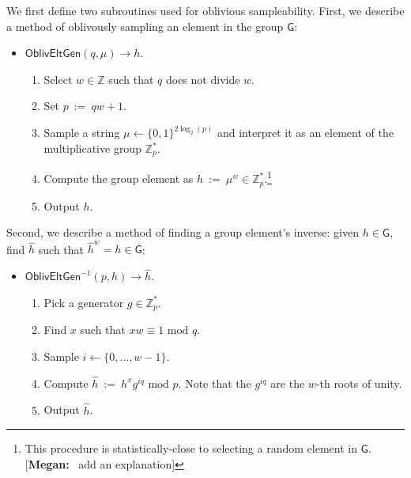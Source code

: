 \documentclass[11pt,letterpaper]{article}
\newcommand{\authnote}[2]{[{\color{red}\textbf{#1:}}~{\color{blue} #2}]}
\newcommand{\authnote}[2]{}
\newcommand{\megan}[1]{\authnote{Megan}{#1}}
\theoremstyle{plain} %
\theoremstyle{definition} %
\theoremstyle{remark} %
\newcommand{\eqdef}{\ {:=} \ }
\newcommand{\Bits}{\{0,1\}}
\newcommand{\Integers}{\mathbb{Z}}
\newcommand{\Group}{\mathsf{G}}
\newcommand{\GrpOrd}{q}
\newcommand{\GrpEltH}{h}
\newcommand{\Generator}{g}
\begin{document}
\newcommand{\GrpEltG}{g}
\newcommand{\MultGrpOrd}{p}
\newcommand{\OrdW}{w}
\newcommand{\RandStr}{\mu}
\newcommand{\OblivEltGen}{\mathsf{OblivEltGen}}
\newcommand{\OblivEltInv}{\mathsf{OblivEltGen}^{-1}}
We first define two subroutines used for oblivious sampleability.
First, we describe a method of oblivously sampling an element in the group $\Group$:
\begin{itemize}
\item[]$\OblivEltGen(\GrpOrd, \RandStr) \to \GrpEltH$.
    \begin{enumerate}[nolistsep]
        \item Select $\OrdW \in \Integers$ such that $\GrpOrd$ does not divide $\OrdW$.
        \item Set $\MultGrpOrd \eqdef \GrpOrd \OrdW + 1$.
        \item Sample a string $\RandStr \gets \Bits^{2 \log_2 (\MultGrpOrd)}$ and interpret it as an element of the multiplicative group $\Integers^{*}_{\MultGrpOrd}$.
        \item Compute the group element as $\GrpEltH \eqdef \RandStr^{\OrdW} \in \Integers^{*}_{\MultGrpOrd}$.\footnote{This procedure is statistically-close to selecting a random element in $\Group$. \megan{add an explanation}}
        \item Output $\GrpEltH$.
    \end{enumerate}
\end{itemize}
\newcommand{\Inv}[1]{\hat{#1}}
Second, we describe a method of finding a group element's inverse: given $\GrpEltH\in\Group$, find $\Inv{\GrpEltH}$ such that $\Inv{\GrpEltH}^\OrdW = \GrpEltH\in\Group$:
\begin{itemize}
\item[]$\OblivEltInv(\MultGrpOrd,\GrpEltH) \to \Inv{\GrpEltH}$.
    \begin{enumerate}[nolistsep]
        \item Pick a generator $\Generator \in \Integers^{*}_{\MultGrpOrd}$.
        \item Find $x$ such that $x\OrdW \equiv 1 \text{ mod } \GrpOrd$.
        \item Sample $i \gets \{0, \ldots, \OrdW-1\}$.
        \item Compute $\Inv{\GrpEltH} \eqdef \GrpEltH^{x}\Generator^{i\GrpOrd} \text{ mod } \MultGrpOrd$. Note that the $\Generator^{i\GrpOrd}$ are the $\OrdW$-th roots of unity.
        \item Output $\Inv{\GrpEltH}$.
    \end{enumerate}
\end{itemize}
\end{document}
